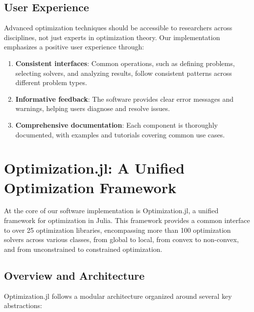 \subsection{User Experience}

Advanced optimization techniques should be accessible to researchers across disciplines, not just experts in optimization theory. Our implementation emphasizes a positive user experience through:

\begin{enumerate}
\item \textbf{Consistent interfaces}: Common operations, such as defining problems, selecting solvers, and analyzing results, follow consistent patterns across different problem types.

\item \textbf{Informative feedback}: The software provides clear error messages and warnings, helping users diagnose and resolve issues.

\item \textbf{Comprehensive documentation}: Each component is thoroughly documented, with examples and tutorials covering common use cases.
\end{enumerate}

\section{Optimization.jl: A Unified Optimization Framework}

At the core of our software implementation is Optimization.jl, a unified framework for optimization in Julia. This framework provides a common interface to over 25 optimization libraries, encompassing more than 100 optimization solvers across various classes, from global to local, from convex to non-convex, and from unconstrained to constrained optimization.

\subsection{Overview and Architecture}

Optimization.jl follows a modular architecture organized around several key abstractions:

